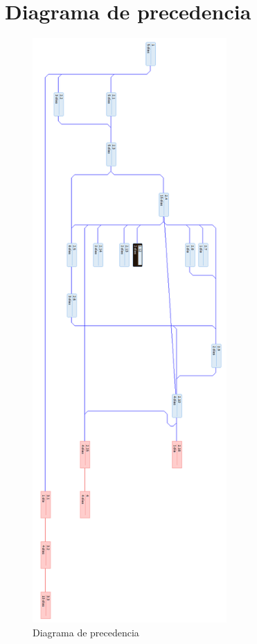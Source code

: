 \documentclass{DeustoFDP}
\begin{document}
\section{Diagrama de precedencia}
\begin{figure}[H]
    \centering
    \includegraphics[width=210pt]{fig/precedencia}
    \caption{Diagrama de precedencia}\label{fig:precedencia}
\end{figure}
\end{document}
